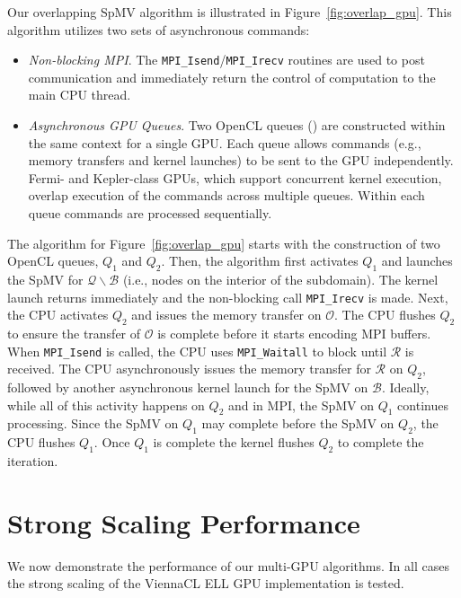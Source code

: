 Our overlapping SpMV algorithm is illustrated in Figure~\ref{fig:overlap_gpu}. This algorithm utilizes two sets of asynchronous commands: 
\begin{itemize} 
\item \emph{Non-blocking MPI}. The \texttt{MPI\_Isend}/\texttt{MPI\_Irecv} routines are used to post communication and immediately return the control of computation to the main CPU thread. 
\item \emph{Asynchronous GPU Queues}. Two OpenCL queues (\cite{Gerstmann2009}) are constructed within the same context for a single GPU. Each queue allows commands (e.g., memory transfers and kernel launches) to be sent to the GPU independently. Fermi- and Kepler-class GPUs, which support concurrent kernel execution, overlap execution of the commands across multiple queues. Within each queue commands are processed sequentially.
\end{itemize}

The algorithm for Figure~\ref{fig:overlap_gpu} starts with the construction of two OpenCL queues, $Q_1$ and $Q_2$. Then, the algorithm first activates $Q_1$ and launches the SpMV for $\mathcal{Q} \backslash \mathcal{B}$ (i.e., nodes on the interior of the subdomain). The kernel launch returns immediately and the non-blocking call \texttt{MPI\_Irecv} is made. Next, the CPU activates $Q_2$ and issues the memory transfer on $\mathcal{O}$. The CPU flushes $Q_2$ to ensure the transfer of $\mathcal{O}$ is complete before it starts encoding MPI buffers. When \texttt{MPI\_Isend} is called, the CPU uses \texttt{MPI\_Waitall} to block until $\mathcal{R}$ is received. The CPU asynchronously issues the memory transfer for $\mathcal{R}$ on $Q_2$, followed by another asynchronous kernel launch for the SpMV on $\mathcal{B}$. Ideally, while all of this activity happens on $Q_2$ and in MPI, the SpMV on $Q_1$ continues processing. Since the SpMV on $Q_1$ may complete before the SpMV on $Q_2$, the CPU flushes $Q_1$. Once $Q_1$ is complete the kernel flushes $Q_2$ to complete the iteration. 

\section{Strong Scaling Performance}

We now demonstrate the performance of our multi-GPU algorithms. In all cases the strong scaling of the ViennaCL ELL GPU implementation is tested.  


